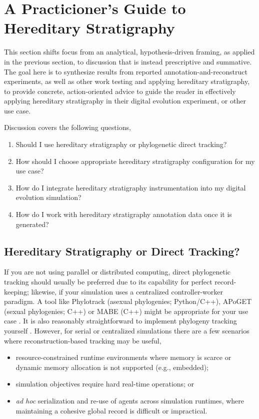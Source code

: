 \section{A Practicioner's Guide to Hereditary Stratigraphy} \label{sec:synthesis}

This section shifts focus from an analytical, hypothesis-driven framing, as applied in the previous section, to discussion that is instead prescriptive and summative.
The goal here is to synthesize results from reported annotation-and-reconstruct experiments, as well as other work testing and applying hereditary stratigraphy, to provide concrete, action-oriented advice to guide the reader in effectively applying hereditary stratigraphy in their digital evolution experiment, or other use case.

Discussion covers the following questions,
\begin{enumerate}
\item Should I use hereditary stratigraphy or phylogenetic direct tracking?
\item How should I choose appropriate hereditary stratigraphy configuration for my use case?
\item How do I integrate hereditary stratigraphy instrumentation into my digital evolution simulation?
\item How do I work with hereditary stratigraphy annotation data once it is generated?
\end{enumerate}

\subsection{Hereditary Stratigraphy or Direct Tracking?}

If you are not using parallel or distributed computing, direct phylogenetic tracking should usually be preferred due to its capability for perfect record-keeping; likewise, if your simulation uses a centralized controller-worker paradigm.
A tool like Phylotrack (asexual phylogenies; Python/C++), APoGET (sexual phylogenies; C++) or MABE (C++) might be appropriate for your use case \citep{dolson2024phylotrackpy,bohm2017mabe,godin2019apoget}.
It is also reasonably straightforward to implement phylogeny tracking yourself \citep{moreno2024algorithms}.
However, for serial or centralized simulations there are a few scenarios where reconstruction-based tracking may be useful,
\begin{itemize}
\item resource-constrained runtime environments where memory is scarce or dynamic memory allocation is not supported (e.g., embedded);
\item simulation objectives require hard real-time operations; or
\item \textit{ad hoc} serialization and re-use of agents across simulation runtimes, where maintaining a cohesive global record is difficult or impractical.
\end{itemize}

